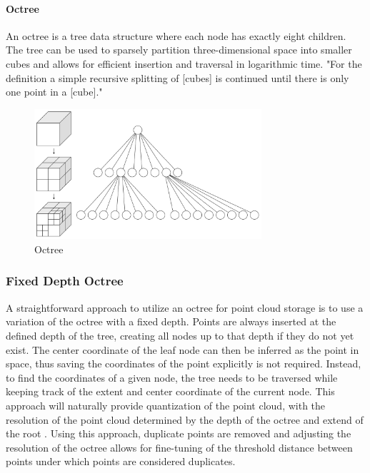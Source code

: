 \paragraph{Octree}
An octree is a tree data structure where each node has exactly eight children.
The tree can be used to sparsely partition three-dimensional space into smaller cubes and allows for efficient
insertion and traversal in logarithmic time.
"For the definition a simple recursive splitting of [cubes] is continued until there is only one point in a [cube]."
\parencite{gabriel_zachmann_geometric_2002}

\begin{figure}[h]
    \centering
    \includegraphics[width=0.75\textwidth]{images/octree}
    \caption{Octree}
    \label{fig:octrree}
\end{figure}

\subsubsection{Fixed Depth Octree}
A straightforward approach to utilize an octree for point cloud storage is to use a variation of the octree with a fixed depth.
Points are always inserted at the defined depth of the tree, creating all nodes up to that depth if they do not yet exist.
The center coordinate of the leaf node can then be inferred as the point in space,
thus saving the coordinates of the point explicitly is not required.
Instead, to find the coordinates of a given node, the tree needs to be traversed while keeping track of
the extent and center coordinate of the current node.
This approach will naturally provide quantization of the point cloud, with the resolution of the point cloud
determined by the depth of the octree and extend of the root .
Using this approach, duplicate points are removed and adjusting the resolution of the octree
allows for fine-tuning of the threshold distance between points under which points are considered duplicates.

